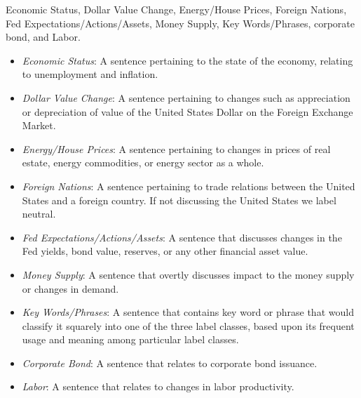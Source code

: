  Economic Status, Dollar Value Change, Energy/House Prices, Foreign Nations, Fed Expectations/Actions/Assets, Money Supply, Key Words/Phrases, corporate bond, and Labor. 

\begin{itemize}
    \item \emph{Economic Status}: A sentence pertaining to the state of the economy, relating to unemployment and inflation.
    \item \emph{Dollar Value Change}: A sentence pertaining to changes such as appreciation or depreciation of value of the United States Dollar on the Foreign Exchange Market.
    \item \emph{Energy/House Prices}: A sentence pertaining to changes in prices of real estate, energy commodities, or energy sector as a whole.
    \item \emph{Foreign Nations}: A sentence pertaining to trade relations between the United States and a foreign country. If not discussing the United States we label neutral.
    \item \emph{Fed Expectations/Actions/Assets}: A sentence that discusses changes in the Fed yields, bond value, reserves, or any other financial asset value.
    \item \emph{Money Supply}: A sentence that overtly discusses impact to the money supply or changes in demand.
    \item \emph{Key Words/Phrases}: A sentence that contains key word or phrase that would classify it squarely into one of the three label classes, based upon its frequent usage and meaning among particular label classes.
    \item \emph{Corporate Bond}: A sentence that relates to corporate bond issuance.
    \item \emph{Labor}: A sentence that relates to changes in labor productivity.
\end{itemize}

